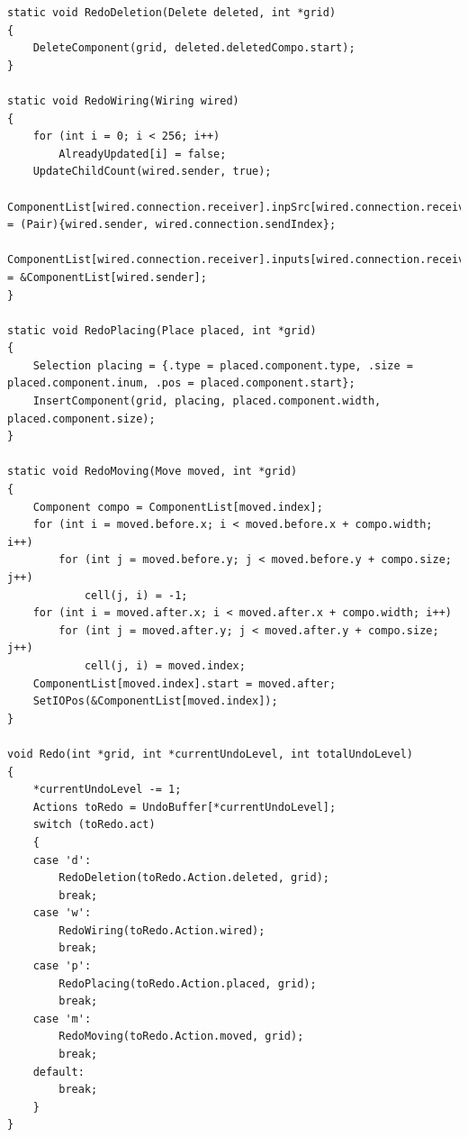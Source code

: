 \documentclass[report]{subfiles}
\begin{document}
\begin{lstlisting}
static void RedoDeletion(Delete deleted, int *grid)
{
    DeleteComponent(grid, deleted.deletedCompo.start);
}

static void RedoWiring(Wiring wired)
{
    for (int i = 0; i < 256; i++)
        AlreadyUpdated[i] = false;
    UpdateChildCount(wired.sender, true);
    ComponentList[wired.connection.receiver].inpSrc[wired.connection.receiveIndex] = (Pair){wired.sender, wired.connection.sendIndex};
    ComponentList[wired.connection.receiver].inputs[wired.connection.receiveIndex] = &ComponentList[wired.sender];
}

static void RedoPlacing(Place placed, int *grid)
{
    Selection placing = {.type = placed.component.type, .size = placed.component.inum, .pos = placed.component.start};
    InsertComponent(grid, placing, placed.component.width, placed.component.size);
}

static void RedoMoving(Move moved, int *grid)
{
    Component compo = ComponentList[moved.index];
    for (int i = moved.before.x; i < moved.before.x + compo.width; i++)
        for (int j = moved.before.y; j < moved.before.y + compo.size; j++)
            cell(j, i) = -1;
    for (int i = moved.after.x; i < moved.after.x + compo.width; i++)
        for (int j = moved.after.y; j < moved.after.y + compo.size; j++)
            cell(j, i) = moved.index;
    ComponentList[moved.index].start = moved.after;
    SetIOPos(&ComponentList[moved.index]);
}

void Redo(int *grid, int *currentUndoLevel, int totalUndoLevel)
{
    *currentUndoLevel -= 1;
    Actions toRedo = UndoBuffer[*currentUndoLevel];
    switch (toRedo.act)
    {
    case 'd':
        RedoDeletion(toRedo.Action.deleted, grid);
        break;
    case 'w':
        RedoWiring(toRedo.Action.wired);
        break;
    case 'p':
        RedoPlacing(toRedo.Action.placed, grid);
        break;
    case 'm':
        RedoMoving(toRedo.Action.moved, grid);
        break;
    default:
        break;
    }
}
\end{lstlisting}
\end{document}
